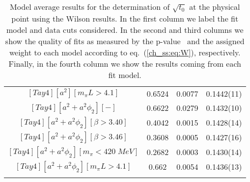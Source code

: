 \begin{longtable}{ c | c | c | c }
$[Tay4][a^2][m_{\pi}L>4.1]$ & 0.6524 & 0.0077 & 0.1442(11) \\
$[Tay4][a^2+a^2\phi_2][-]$ & 0.6622 & 0.0279 & 0.1432(10) \\
$[Tay4][a^2+a^2\phi_2][\beta>3.40]$ & 0.4042 & 0.0015 & 0.1428(14) \\
$[Tay4][a^2+a^2\phi_2][\beta>3.46]$ & 0.3608 & 0.0005 & 0.1427(16) \\
$[Tay4][a^2+a^2\phi_2][m_{\pi}<420\;MeV]$ & 0.2682 & 0.0003 & 0.1430(14) \\
$[Tay4][a^2+a^2\phi_2][m_{\pi}L>4.1]$ & 0.662 & 0.0054 & 0.1436(13) \\
\bottomrule
\caption{Model average results for the determination of $\sqrt{t_0}$ at the physical point using the Wilson results. In the first column we label the fit model and data cuts considered. In the second and third columns we show the quality of fits as measured by the p-value~\citep{Bruno:2022mfy} and the assigned weight to each model according to eq.~(\ref{ch_ss:eq:W}), respectively. Finally, in the fourth column we show the results coming from each fit model.}
\end{longtable}

\vspace{1cm}


